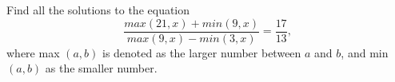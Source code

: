 Find all the solutions to the equation \[\dfrac{max(21,x) + min(9,x)}{max(9,x) - min(3, x)}=\dfrac{17}{13},\]where max $(a,b)$ is denoted as the larger number between $a$ and $b$, and min $(a,b)$ as the smaller number.
